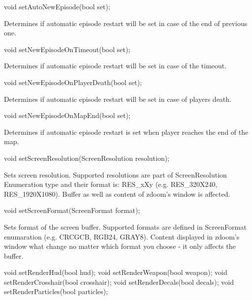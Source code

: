 \vspace{20pt}
\begin{clinee}
void setAutoNewEpisode(bool set);
\end{clinee}

Determines if automatic episode restart will be set in case of the end of previous one.


\vspace{20pt}
\begin{clinee}
void setNewEpisodeOnTimeout(bool set);
\end{clinee}

Determines if automatic episode restart will be set in case of the timeout.


\vspace{20pt}
\begin{clinee}
void setNewEpisodeOnPlayerDeath(bool set);
\end{clinee}

Determines if automatic episode restart will be set in case of players death.


\vspace{20pt}
\begin{clinee}
void setNewEpisodeOnMapEnd(bool set);
\end{clinee}

Determines if automatic episode restart is set when player reaches the end of the map.


\vspace{20pt}
\begin{clinee}
void setScreenResolution(ScreenResolution resolution);
\end{clinee}

Sets screen resolution. Supported resolutions are part of ScreenResolution Enumeration type and their format is: RES\_xXy (e.g. RES\_320X240, RES\_1920X1080). Buffer as well as content of zdoom's window is affected.


\vspace{20pt}
\begin{clinee}
 void setScreenFormat(ScreenFormat format);
\end{clinee}

Sets format of the screen buffer. Supported formats are defined in ScreenFormat enumaration (e.g. CRCGCB, RGB24, GRAY8). Content displayed in zdoom's window what change no matter which format you choose - it only affects the buffer.


\vspace{20pt}
\begin{clinee}       
void setRenderHud(bool hud);
void setRenderWeapon(bool weapon);
void setRenderCrosshair(bool crosshair);
void setRenderDecals(bool decals);
void setRenderParticles(bool particles);
\end{clinee}

